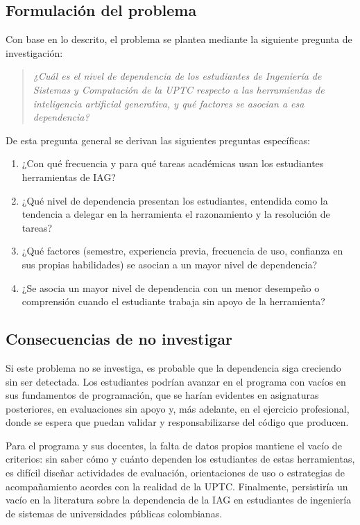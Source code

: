 \documentclass[12pt,letterpaper]{article}
\numberwithin{table}{section}
\numberwithin{figure}{section}
\begin{document}
\subsection{Formulación del problema}

Con base en lo descrito, el problema se plantea mediante la siguiente pregunta de investigación:

\begin{quote}
\emph{¿Cuál es el nivel de dependencia de los estudiantes de Ingeniería de Sistemas y Computación de la UPTC respecto a las herramientas de inteligencia artificial generativa, y qué factores se asocian a esa dependencia?}
\end{quote}

De esta pregunta general se derivan las siguientes preguntas específicas:

\begin{enumerate}
  \item ¿Con qué frecuencia y para qué tareas académicas usan los estudiantes herramientas de IAG?
  \item ¿Qué nivel de dependencia presentan los estudiantes, entendida como la tendencia a delegar en la herramienta el razonamiento y la resolución de tareas?
  \item ¿Qué factores (semestre, experiencia previa, frecuencia de uso, confianza en sus propias habilidades) se asocian a un mayor nivel de dependencia?
  \item ¿Se asocia un mayor nivel de dependencia con un menor desempeño o comprensión cuando el estudiante trabaja sin apoyo de la herramienta?
\end{enumerate}

\subsection{Consecuencias de no investigar}

Si este problema no se investiga, es probable que la dependencia siga creciendo sin ser detectada. Los estudiantes podrían avanzar en el programa con vacíos en sus fundamentos de programación, que se harían evidentes en asignaturas posteriores, en evaluaciones sin apoyo y, más adelante, en el ejercicio profesional, donde se espera que puedan validar y responsabilizarse del código que producen.

Para el programa y sus docentes, la falta de datos propios mantiene el vacío de criterios: sin saber cómo y cuánto dependen los estudiantes de estas herramientas, es difícil diseñar actividades de evaluación, orientaciones de uso o estrategias de acompañamiento acordes con la realidad de la UPTC. Finalmente, persistiría un vacío en la literatura sobre la dependencia de la IAG en estudiantes de ingeniería de sistemas de universidades públicas colombianas.
\end{document}
